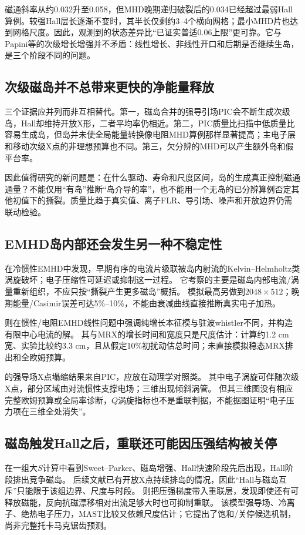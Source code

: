 \documentclass[UTF8,a4paper,11pt,openany,fontset=fandol]{ctexbook}
\begin{document}
磁通斜率从约0.032升至0.058，但MHD晚期递归破裂后的0.034已经超过最弱Hall算例。较强Hall层长逐渐不变时，其半长仅剩约3--4个横向网格；最小MHD片也达到网格尺度。因此，观测到的状态差异比“已证实普适0.06上限”更可靠。它与Papini等的次级增长增强并不矛盾：线性增长、非线性开口和后期是否继续生岛，是三个阶段不同的问题。\citep{L262,L263}

\subsection{次级磁岛并不总带来更快的净能量释放}
三个证据应并列而非互相替代。第一，磁岛合并的强导引场PIC会不断生成次级岛，Hall却维持开放X形，二者平均率仍相近\citep{L241}。第二，PIC质量比扫描中低质量比容易生成岛，但岛并未使全局能量转换像电阻MHD算例那样显著提高；主电子层和移动次级X点的非理想预算也不同\citep{F606}。第三，欠分辨的MHD可以产生额外岛和假平台率\citep{F788}。

因此值得研究的新问题是：在什么驱动、寿命和尺度区间，岛的生成真正控制磁通通量？不能仅用“有岛”推断“岛介导的率”，也不能用一个无岛的已分辨算例否定其他初值下的撕裂。质量比趋于真实值、离子FLR、导引场、噪声和开放边界仍需联动检验。

\subsection{EMHD岛内部还会发生另一种不稳定性}
\citet{E459}在冷惯性EMHD中发现，早期有序的电流片级联被岛内射流的Kelvin--Helmholtz类涡旋破坏；电子压缩性可延迟或抑制这一过程。
它考察的主要是磁岛内部电流/涡量重新组织，不应只按“撕裂产生更多磁岛”概括。
模拟最高另做到$2048\times512$；晚期能量/Casimir误差可达5\%--10\%，不能由衰减曲线直接推断真实电子加热。

\citet{L202}则在惯性/电阻EMHD线性问题中强调纯增长本征模与驻波whistler不同，并构造有限中心电流的解。
其与MRX的增长时间和宽度只是尺度估计：计算约1.2 cm宽、实验比较约3.3 cm，且从假定10\%初扰动估总时间；未直接模拟稳态MRX排出和全欧姆预算。

\citet{L230}的强导场X点塌缩结果来自PIC，应放在动理学对照类。
其中电子涡旋可伴随次级X点，部分区域由对流惯性支撑电场；三维出现倾斜涡管。
但其三维图没有相应完整欧姆预算或全局率诊断，$Q$涡旋指标也不是重联判据，不能据图证明“电子压力项在三维全处消失”。

\subsection{磁岛触发Hall之后，重联还可能因压强结构被关停}
\citet{L159}在一组大$S$计算中看到Sweet--Parker、磁岛增强、Hall快速阶段先后出现，Hall阶段排出竞争磁岛。
后续文献已有开放X点持续排岛的情况，因此“Hall与磁岛互斥”只能限于该组边界、尺度与时段。
\citet{L174}则把压强梯度带入重联层，发现即使还有可释放磁能，反向抗磁漂移相对出流足够大时也可抑制重联。
该模型强导场、冷离子、绝热电子压力，MAST比较又依赖尺度估计；它提出了饱和/关停候选机制，尚非完整托卡马克锯齿预测。
\end{document}
